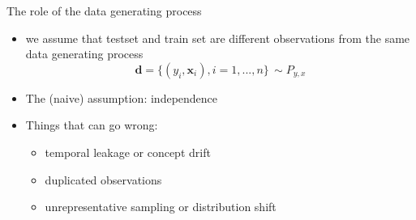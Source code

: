 \documentclass[10pt]{beamer}
\begin{document}













\begin{frame}{The role of the data generating process}

\begin{itemize}
\item we assume that testset and train set are different observations from the same data generating process
\[
\mathbf{d} = \{(y_i, \mathbf{x}_i), i = 1, ..., n\} \,\sim P_{y,x}
\]
\item The (naive) assumption: independence
\item Things that can go wrong:
\begin{itemize}
\item temporal leakage or concept drift
\item duplicated observations
\item unrepresentative sampling or distribution shift
\end{itemize}
\pause
\end{itemize}


\end{frame}
\end{document}

